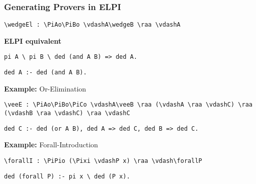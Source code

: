 \begin{frame}[fragile]
    \frametitle{Generating Provers in ELPI}
     \lstinline[language=MMT]|\wedgeEl : \PiAo\PiBo \vdashA\wedgeB \raa \vdashA|

    \vspace{1.0em}
    \textbf{ELPI equivalent}

    \vspace{0.5em}
     \lstinline[language=ELPI]|pi A \ pi B \ ded (and A B) => ded A.|

    \vspace{0.5em}
     \lstinline[language=ELPI]|ded A :- ded (and A B).|

% 
    \vspace{1.5em}
    \pause

    \begin{block}{{\bfseries Example:} Or-Elimination}
    \begin{minipage}{0.85\textwidth}
        \lstinline[keepspaces=true,language=MMT]|\veeE : \PiAo\PiBo\PiCo \vdashA\veeB \raa (\vdashA \raa \vdashC) \raa (\vdashB \raa \vdashC) \raa \vdashC|
    \end{minipage}

    \vspace{0.5em}
    \lstinline[language=ELPI,keepspaces=true]|ded C :- ded (or A B), ded A => ded C, ded B => ded C.|
    \end{block}

    \vspace{0.5em}

    \begin{block}{{\bfseries Example:} Forall-Introduction}
    \begin{minipage}{0.85\textwidth}
        \lstinline[keepspaces=true,language=MMT]|\forallI : \PiPio (\Pixi \vdashP x) \raa \vdash\forallP|
    \end{minipage}

    \vspace{0.5em}
    \lstinline[language=ELPI,keepspaces=true]|ded (forall P) :- pi x \ ded (P x).|
    \vspace{0.5em}
    \end{block}
\end{frame}

